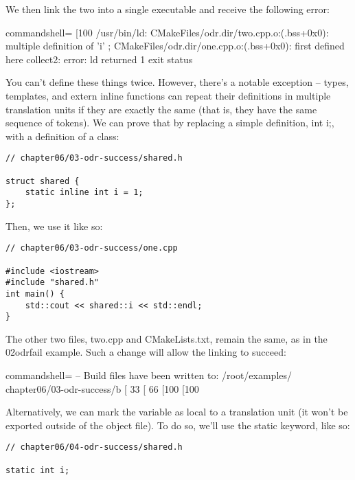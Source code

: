 We then link the two into a single executable and receive the following error:

\begin{tcblisting}{commandshell={}}
[100%
/usr/bin/ld: CMakeFiles/odr.dir/two.cpp.o:(.bss+0x0): multiple
definition of 'i'
; CMakeFiles/odr.dir/one.cpp.o:(.bss+0x0): first defined here
collect2: error: ld returned 1 exit status
\end{tcblisting}

You can't define these things twice. However, there's a notable exception – types, templates, and extern inline functions can repeat their definitions in multiple translation units if they are exactly the same (that is, they have the same sequence of tokens). We can prove that by replacing a simple definition, int i;, with a definition of a class:

\begin{lstlisting}[style=styleCXX]
// chapter06/03-odr-success/shared.h

struct shared {
	static inline int i = 1;
};
\end{lstlisting}

Then, we use it like so:

\begin{lstlisting}[style=styleCXX]
// chapter06/03-odr-success/one.cpp

#include <iostream>
#include "shared.h"
int main() {
	std::cout << shared::i << std::endl;
}
\end{lstlisting}

The other two files, two.cpp and CMakeLists.txt, remain the same, as in the 02odrfail example. Such a change will allow the linking to succeed:

\begin{tcblisting}{commandshell={}}
-- Build files have been written to: /root/examples/
chapter06/03-odr-success/b
[ 33%
[ 66%
[100%
[100%
\end{tcblisting}

Alternatively, we can mark the variable as local to a translation unit (it won't be exported outside of the object file). To do so, we'll use the static keyword, like so:

\begin{lstlisting}[style=styleCXX]
// chapter06/04-odr-success/shared.h

static int i;
\end{lstlisting}

